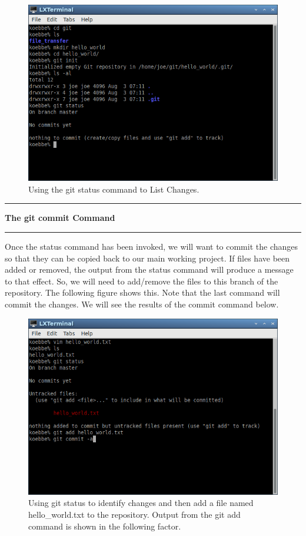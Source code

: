 \documentclass[10pt,fleqn]{article}
\begin{document}
\begin{figure}[h]
\centering
\includegraphics[width=5.0in]{../images/git_06.png}
\vskip0.1in
\caption{Using the git status command to List Changes.}
\end{figure}
\eject
\vskip0.1in\hrule\vskip0.1in\noindent
{\bf The git commit Command} 
\vskip0.1in\hrule\vskip0.1in\noindent
Once the status command has been invoked, we will want to commit the changes so
that they can be copied back to our main working project. If files have been
added or removed, the output from the status command will produce a message to
that effect. So, we will need to add/remove the files to this branch of the
repository. The following figure shows this. Note that the last command will 
commit the changes. We will see the results of the commit command below.
\vfill
\begin{figure}[h]
\centering
\includegraphics[width=5.0in]{../images/git_07.png}
\caption{Using git status to identify changes and then add a file named
hello\_world.txt to the repository. Output from the git add command is shown in
the following factor.}
\end{figure}
\end{document}
